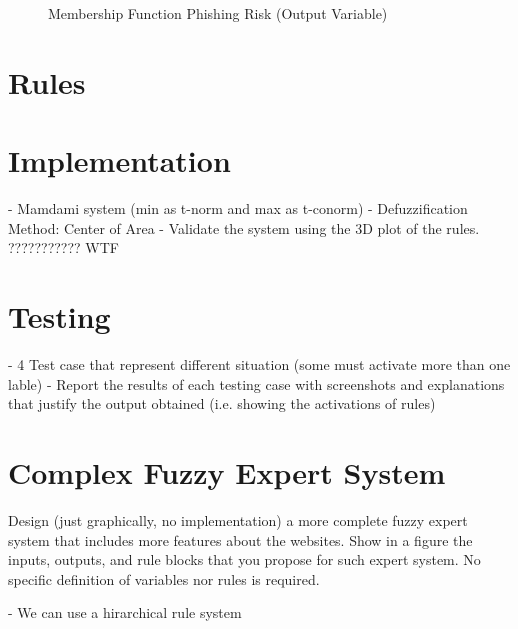 \documentclass[11pt]{article}
\begin{document}
\begin{figure}[H]
    \centering
    \caption{Membership Function Phishing Risk (Output Variable)}
    \label{output_variable}
\end{figure}

\section{Rules}

\section{Implementation}
- Mamdami system (min as t-norm and max as t-conorm)
- Defuzzification Method: Center of Area
- Validate the system using the 3D plot of the rules. ??????????? WTF %

\section{Testing}
- 4 Test case that represent different situation (some must activate more than one lable)
- Report the results of each testing case with 
screenshots  and  explanations  that  justify the output  obtained  (i.e.  showing  the  activations of  
rules)

\section{Complex Fuzzy Expert System}
Design (just graphically, no implementation) a more complete fuzzy expert system that 
includes more features about the websites. Show in a figure the inputs, outputs, and rule blocks 
that you propose for such expert system. No specific definition of variables nor rules is required. 

- We can use a hirarchical rule system

\newpage
\printbibliography
\end{document}
